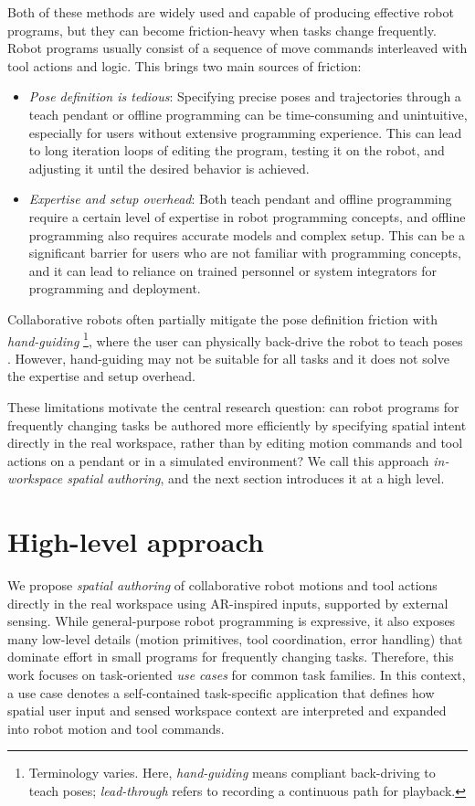 Both of these methods are widely used and capable of producing effective robot programs, but they can become friction-heavy when tasks change frequently. Robot programs usually consist of a sequence of move commands interleaved with tool actions and logic. This brings two main sources of friction:
\begin{itemize}
    \item \emph{Pose definition is tedious}: Specifying precise poses and trajectories through a teach pendant or offline programming can be time-consuming and unintuitive, especially for users without extensive programming experience. This can lead to long iteration loops of editing the program, testing it on the robot, and adjusting it until the desired behavior is achieved.
    \item \emph{Expertise and setup overhead}: Both teach pendant and offline programming require a certain level of expertise in robot programming concepts, and offline programming also requires accurate models and complex setup. This can be a significant barrier for users who are not familiar with programming concepts, and it can lead to reliance on trained personnel or system integrators for programming and deployment.
\end{itemize}

Collaborative robots often partially mitigate the pose definition friction with \emph{hand-guiding} \footnote{Terminology varies. Here, \emph{hand-guiding} means compliant back-driving to teach poses; \emph{lead-through} refers to recording a continuous path for playback.}, where the user can physically back-drive the robot to teach poses \cite{KassowRobotsManuals}. However, hand-guiding may not be suitable for all tasks and it does not solve the expertise and setup overhead.

These limitations motivate the central research question: can robot programs for frequently changing tasks be authored more efficiently by specifying spatial intent directly in the real workspace, rather than by editing motion commands and tool actions on a pendant or in a simulated environment? We call this approach \emph{in-workspace spatial authoring}, and the next section introduces it at a high level.


\section*{High-level approach}

We propose \emph{spatial authoring} of collaborative robot motions and tool actions directly in the real workspace using AR-inspired inputs, supported by external sensing. While general-purpose robot programming is expressive, it also exposes many low-level details (motion primitives, tool coordination, error handling) that dominate effort in small programs for frequently changing tasks. Therefore, this work focuses on task-oriented \emph{use cases} for common task families. In this context, a use case denotes a self-contained task-specific application that defines how spatial user input and sensed workspace context are interpreted and expanded into robot motion and tool commands.

